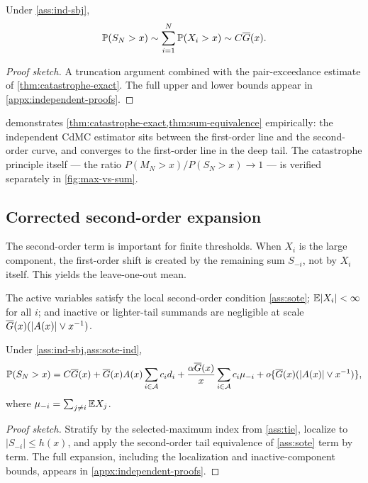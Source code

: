 \begin{theorem}
\label{thm:sum-equivalence}
Under \cref{ass:ind-sbj},
\[
  \mathbb{P}(S_N>x)
  \sim \sum_{i=1}^N\mathbb{P}(X_i>x)
  \sim C\overline{G}(x).
\]
\end{theorem}

\begin{proof}[Proof sketch]
A truncation argument combined with the pair-exceedance estimate of
\cref{thm:catastrophe-exact}. The full upper and lower bounds appear in
\cref{appx:independent-proofs}.
\end{proof}



 demonstrates
\cref{thm:catastrophe-exact,thm:sum-equivalence} empirically: the
independent CdMC estimator sits between the first-order line and the
second-order curve, and converges to the first-order line in the deep
tail. The catastrophe principle itself --- the ratio
$P(M_N > x) / P(S_N > x) \to 1$ --- is verified separately in
\cref{fig:max-vs-sum}.

\subsection{Corrected second-order expansion}

The second-order term is important for finite thresholds. When \(X_i\) is the
large component, the first-order shift is created by the remaining sum
\(S_{-i}\), not by \(X_i\) itself. This yields the leave-one-out mean.

\begin{assumption}
\label{ass:sote-ind}
The active variables satisfy the local second-order condition
\cref{ass:sote}; \(\mathbb{E}|X_i|<\infty\) for all \(i\); and inactive or lighter-tail
summands are negligible at scale \(\overline{G}(x)(|A(x)|\vee x^{-1})\).
\end{assumption}

\begin{theorem}
\label{thm:second-order}
Under \cref{ass:ind-sbj,ass:sote-ind},
\[
  \mathbb{P}(S_N>x)
  = C\overline{G}(x)
    + \overline{G}(x)A(x)\sum_{i\in\mathcal{A}}c_id_i
    + \frac{\alpha\overline{G}(x)}{x}\sum_{i\in\mathcal{A}}c_i\mu_{-i}
    + o\{\overline{G}(x)(|A(x)|\vee x^{-1})\},
\]
where \(\mu_{-i}=\sum_{j\ne i}\mathbb{E} X_j\).
\end{theorem}

\begin{proof}[Proof sketch]
Stratify by the selected-maximum index from \cref{ass:tie}, localize to
\(|S_{-i}|\le h(x)\), and apply the second-order tail equivalence of
\cref{ass:sote} term by term. The full expansion, including the localization
and inactive-component bounds, appears in \cref{appx:independent-proofs}.
\end{proof}

